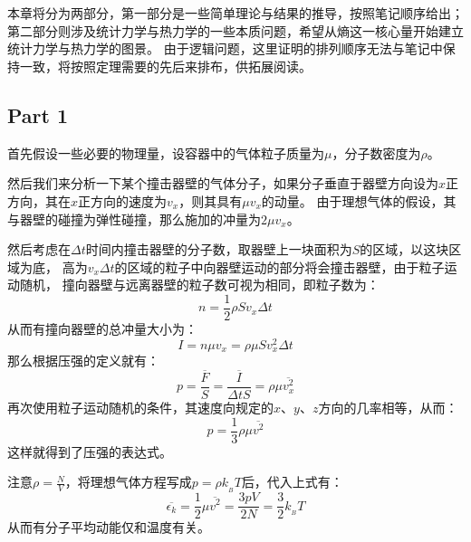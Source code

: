 %
    \chapter[热力学]{}
        本章将分为两部分，第一部分是一些简单理论与结果的推导，按照笔记顺序给出；
        第二部分则涉及统计力学与热力学的一些本质问题，希望从熵这一核心量开始建立统计力学与热力学的图景。
        由于逻辑问题，这里证明的排列顺序无法与笔记中保持一致，将按照定理需要的先后来排布，供拓展阅读。
        \section{Part 1}
        \begin{prove}
            首先假设一些必要的物理量，设容器中的气体粒子质量为$\mu$，分子数密度为$\rho$。

            然后我们来分析一下某个撞击器壁的气体分子，如果分子垂直于器壁方向设为$x$正方向，其在$x$正方向的速度为$v_x$，则其具有$\mu v_x$的动量。
            由于理想气体的假设，其与器壁的碰撞为弹性碰撞，那么施加的冲量为$2\mu v_x$。

            然后考虑在$\Delta t$时间内撞击器壁的分子数，取器壁上一块面积为$S$的区域，以这块区域为底，
            高为$v_x \Delta t$的区域的粒子中向器壁运动的部分将会撞击器壁，由于粒子运动随机，
            撞向器壁与远离器壁的粒子数可视为相同，即粒子数为：
            \begin{equation}
                n = \frac{1}{2} \rho S v_x \Delta t
                \nonumber
            \end{equation}
            从而有撞向器壁的总冲量大小为：
            \begin{equation}
                I = n \mu v_x = \rho \mu S v_{x}^{2} \Delta t
                \nonumber
            \end{equation}
            那么根据压强的定义就有：
            \begin{equation}
                p = \frac{\overline{F}}{S} = \frac{\overline{I}}{\Delta tS} = \rho \mu \overline{v_{x}^{2}}
                \nonumber
            \end{equation}                                                                      
            再次使用粒子运动随机的条件，其速度向规定的$x$、$y$、$z$方向的几率相等，从而：
            \begin{equation}
                p = \frac{1}{3}\rho \mu \overline{v^{2}}
            \end{equation}          
            这样就得到了压强的表达式。

            注意$\rho = \frac{N}{V}$，将理想气体方程写成$p = \rho k_{_B}T$后，代入上式有：
            \begin{equation}
                \overline{\epsilon_k} = \frac{1}{2}\mu \overline{v^{2}}  = \frac{3pV}{2N} = \frac{3}{2} k_{_B}T  
            \end{equation}
            从而有分子平均动能仅和温度有关。
        \end{prove}
